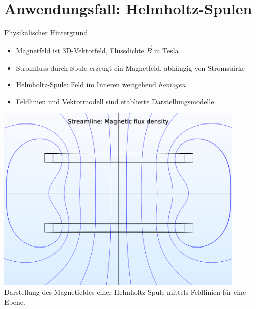 \part{Anwendungsfall: Helmholtz-Spulen}
\label{part:physics}
\begin{frame}[fragile]{Physikalischer Hintergrund}
\begin{minipage}{0.5\textwidth}
	{
		\begin{itemize}[itemsep=1mm]
			\item Magnetfeld ist 3D-Vektorfeld, Flussdichte $\vec{B}$ in Tesla
			\item Stromfluss durch Spule erzeugt ein Magnetfeld, abhängig von Stromstärke
			\item Helmholtz-Spule: Feld im Inneren weitgehend \textit{homogen}
			\item Feldlinien und Vektormodell sind etablierte Darstellungsmodelle
		\end{itemize}
	}
\end{minipage}
\begin{minipage}{0.45\textwidth}
	\centering
	\includegraphics[width=0.9\textwidth]{images/papers/hh_mfield_nocol.png}\\
	\small Darstellung des Magnetfeldes einer Helmholtz-Spule mittels Feldlinien für eine Ebene.
\end{minipage}
\end{frame}

